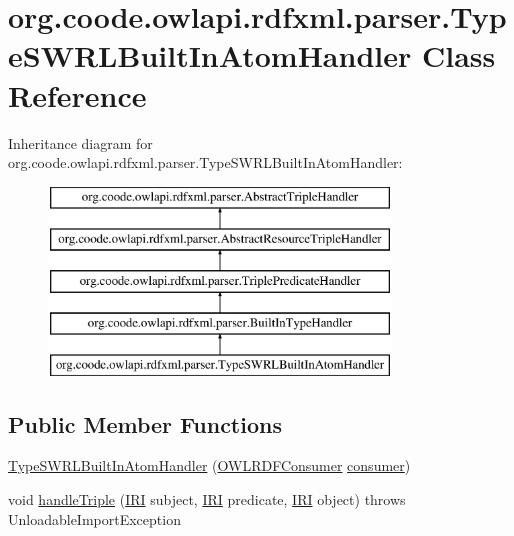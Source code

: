 \hypertarget{classorg_1_1coode_1_1owlapi_1_1rdfxml_1_1parser_1_1_type_s_w_r_l_built_in_atom_handler}{\section{org.\-coode.\-owlapi.\-rdfxml.\-parser.\-Type\-S\-W\-R\-L\-Built\-In\-Atom\-Handler Class Reference}
\label{classorg_1_1coode_1_1owlapi_1_1rdfxml_1_1parser_1_1_type_s_w_r_l_built_in_atom_handler}
}
Inheritance diagram for org.\-coode.\-owlapi.\-rdfxml.\-parser.\-Type\-S\-W\-R\-L\-Built\-In\-Atom\-Handler\-:\begin{figure}[H]
\begin{center}
\leavevmode
\includegraphics[height=5.000000cm]{classorg_1_1coode_1_1owlapi_1_1rdfxml_1_1parser_1_1_type_s_w_r_l_built_in_atom_handler}
\end{center}
\end{figure}
\subsection*{Public Member Functions}
\begin{DoxyCompactItemize}
\item 
\hyperlink{classorg_1_1coode_1_1owlapi_1_1rdfxml_1_1parser_1_1_type_s_w_r_l_built_in_atom_handler_a4b6efb40adeb5a990b8ace8c015641ad}{Type\-S\-W\-R\-L\-Built\-In\-Atom\-Handler} (\hyperlink{classorg_1_1coode_1_1owlapi_1_1rdfxml_1_1parser_1_1_o_w_l_r_d_f_consumer}{O\-W\-L\-R\-D\-F\-Consumer} \hyperlink{classorg_1_1coode_1_1owlapi_1_1rdfxml_1_1parser_1_1_abstract_triple_handler_a4ccf4d898ff01eb1cadfa04b23d54e9c}{consumer})
\item 
void \hyperlink{classorg_1_1coode_1_1owlapi_1_1rdfxml_1_1parser_1_1_type_s_w_r_l_built_in_atom_handler_afc6f35b9f2accf1415f811cf35c0e953}{handle\-Triple} (\hyperlink{classorg_1_1semanticweb_1_1owlapi_1_1model_1_1_i_r_i}{I\-R\-I} subject, \hyperlink{classorg_1_1semanticweb_1_1owlapi_1_1model_1_1_i_r_i}{I\-R\-I} predicate, \hyperlink{classorg_1_1semanticweb_1_1owlapi_1_1model_1_1_i_r_i}{I\-R\-I} object)  throws Unloadable\-Import\-Exception 
\end{DoxyCompactItemize}
